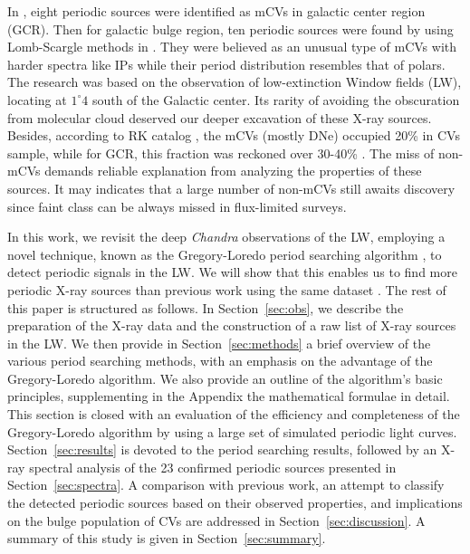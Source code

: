 \documentclass[fleqn,usenatbib]{mnras}
\begin{document}

In \citet{2003ApJ...599..465M}, eight periodic sources were identified as mCVs in galactic center region (GCR). Then for galactic bulge region, ten periodic sources were found by using Lomb-Scargle methods in \citep{2012ApJ...746..165H}. They were believed as an unusual type of mCVs with harder spectra like IPs while their period distribution resembles that of polars. The research was based on the observation of low-extinction Window fields (LW), locating at $1^{\circ}4$ south of the Galactic center. Its rarity of avoiding the obscuration from molecular cloud deserved our deeper excavation of these X-ray sources. 
Besides, according to RK catalog \citep{2003A&A...404..301R}, the mCVs (mostly DNe) occupied 20\% in CVs sample, while for GCR, this fraction was reckoned over 30-40\% \citep{2016ApJ...826..160H,2012ApJ...746..165H}. The miss of non-mCVs demands reliable explanation from analyzing the properties of these sources. It may indicates that a large number of non-mCVs still awaits discovery since faint class can be always missed in flux-limited surveys.

In this work, we revisit the deep {\it Chandra} observations of the LW, employing a novel technique, known as the Gregory-Loredo period searching algorithm \citep{1992ApJ...398..146G}, to detect periodic signals in the LW. We will show that this enables us to find more periodic X-ray sources than previous work using the same dataset \citep{2012ApJ...746..165H}. 
The rest of this paper is structured as follows.
In Section~\ref{sec:obs}, we describe the preparation of the X-ray data and the construction of a raw list of X-ray sources in the LW.
We then provide in Section~\ref{sec:methods} a brief overview of the various period searching methods, with an emphasis on the advantage of the Gregory-Loredo algorithm. We also provide an outline of the algorithm's basic principles, supplementing in the Appendix the mathematical formulae in detail.
This section is closed with an evaluation of the efficiency and completeness of the Gregory-Loredo algorithm by using a large set of simulated periodic light curves. 
Section~\ref{sec:results} is devoted to the period searching results, followed by an X-ray spectral analysis of the 23 confirmed periodic sources presented in Section~\ref{sec:spectra}.
A comparison with previous work, an attempt to classify the detected periodic sources based on their observed properties, and implications on the bulge population of CVs are addressed in Section~\ref{sec:discussion}.
A summary of this study is given in Section~\ref{sec:summary}.
\end{document}

